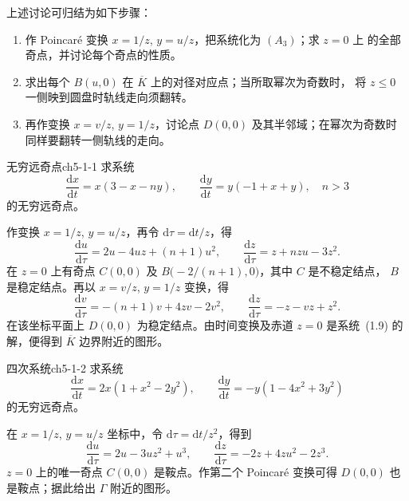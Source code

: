 
上述讨论可归结为如下步骤：

\begin{enumerate}
  \item 作 Poincar\'e 变换 $x=1/z$, $y=u/z$，把系统化为 $(A_3)$；求 $z=0$ 上
  的全部奇点，并讨论每个奇点的性质。
  \item 求出每个 $B(u,0)$ 在 $\overline K$ 上的对径对应点；当所取幂次为奇数时，
  将 $z\le0$ 一侧映到圆盘时轨线走向须翻转。
  \item 再作变换 $x=v/z$, $y=1/z$，讨论点 $D(0,0)$ 及其半邻域；在幂次为奇数时
  同样要翻转一侧轨线的走向。
\end{enumerate}

\begin{example}{无穷远奇点}{ch5-1-1}
求系统
\[
  \dfrac{\mathrm{d}x}{\mathrm{d}t}=x(3-x-ny),\qquad
  \dfrac{\mathrm{d}y}{\mathrm{d}t}=y(-1+x+y),\quad n>3 \tag{1.7}
\]
的无穷远奇点。
\end{example}
\begin{solution}
作变换 $x=1/z$, $y=u/z$，再令 $\mathrm{d}\tau=\mathrm{d}t/z$，得
\[
  \dfrac{\mathrm{d}u}{\mathrm{d}\tau}=2u-4uz+(n+1)u^2,\qquad
  \dfrac{\mathrm{d}z}{\mathrm{d}\tau}=z+nzu-3z^2. \tag{1.9}
\]
在 $z=0$ 上有奇点 $C(0,0)$ 及 $B\bigl(-2/(n+1),0\bigr)$，其中 $C$ 是不稳定结点，
$B$ 是稳定结点。再以 $x=v/z$, $y=1/z$ 变换，得
\[
  \dfrac{\mathrm{d}v}{\mathrm{d}\tau}=-(n+1)v+4zv-2v^2,\qquad
  \dfrac{\mathrm{d}z}{\mathrm{d}\tau}=-z-vz+z^2. \tag{1.11}
\]
在该坐标平面上 $D(0,0)$ 为稳定结点。由时间变换及赤道 $z=0$ 是系统~(1.9) 的
解，便得到 $\overline K$ 边界附近的图形。
\end{solution}


\begin{example}{四次系统}{ch5-1-2}
求系统
\[
  \dfrac{\mathrm{d}x}{\mathrm{d}t}=2x(1+x^2-2y^2),\qquad
  \dfrac{\mathrm{d}y}{\mathrm{d}t}=-y(1-4x^2+3y^2) \tag{1.12}
\]
的无穷远奇点。
\end{example}
\begin{solution}
在 $x=1/z$, $y=u/z$ 坐标中，令 $\mathrm{d}\tau=\mathrm{d}t/z^2$，得到
\[
  \dfrac{\mathrm{d}u}{\mathrm{d}\tau}=2u-3uz^2+u^3,\qquad
  \dfrac{\mathrm{d}z}{\mathrm{d}\tau}=-2z+4zu^2-2z^3. \tag{1.14}
\]
$z=0$ 上的唯一奇点 $C(0,0)$ 是鞍点。作第二个 Poincar\'e 变换可得 $D(0,0)$
也是鞍点；据此给出 $\Gamma$ 附近的图形。
\end{solution}


